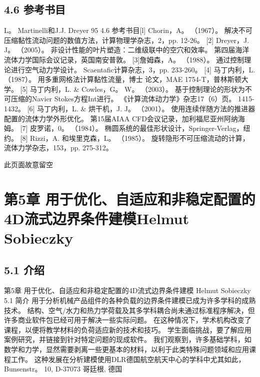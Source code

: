 \documentclass[UTF8,11pt,a4paper,openany,fontset=fandol]{ctexbook}
\begin{document}
\section{4.6 参考书目}
L。 Martinelli和J.J. Dreyer 95 4.6 参考书目[l] Chorin，A。 （1967）。 解决不可压缩黏性流动问题的数值方法，计算物理学杂志，2，pp. 12-26。 [2] Dreyer，J. J。 （2005）。 非设计性能的叶片塑造：二维级联中的空穴和效率。 第四届海洋流体力学国际会议记录，英国南安普敦。 [3]詹姆森，A。 （1988）。 通过控制理论进行空气动力学设计。 Scaentafic计算杂志，3，pp. 233-260。 [4] 马丁内利，L. （1987）。 用多重网格法计算黏性流量，博士 论文，MAE 1754-T，普林斯顿大学。 [5] 马丁内利，L. \& Cowles，G。 W。 （2003）。 基于控制理论的形状为不可压缩的Navier Stokes方程Int进行。 《计算流体动力学》杂志17（6）页。 1415-1432。 [6] 马丁内利，L. \& 烘干机，J. J。 （2001）。 使用连续伴随方法的推进器配置的流体力学外形优化。 第15届AIAA CFD会议记录，加利福尼亚州阿纳海姆。 [7] 皮罗诺，0。 （1984）。 椭圆系统的最佳形状设计，Springer-Verlag，纽约。 [8] Rizzi，A. 和埃里克森，L。 （1985）。 旋转隐形不可压缩流动的计算，流体力学杂志，153，pp. 275-312。

此页面故意留空

\clearpage
\chapter{第5章 用于优化、自适应和非稳定配置的4D流式边界条件建模Helmut Sobieczky}
\section{5.1 介绍}
第5章 用于优化、自适应和非稳定配置的4D流式边界条件建模 Helmut Sobieczky 5.1 简介 用于分析机械产品组件的各种负载的边界条件建模已成为许多学科的成熟技术。 结构、空气/水力和热力学荷载及其多学科耦合尚未通过标准程序解决，但许多商业软件包已经可用于解决一些实际问题。 在这种情况下，学术机构改变了课程，以便将教学材料的负荷适应新的技术和技巧。 学生面临挑战，要了解应用案例研究，并链接到针对特定问题的现成软件。 我们观察到，许多基础学科，如数学和力学，显然需要剥离一些更基本的材料，以利于此类特殊问题领域和应用课程工作。 这种发展在分析建模使用DLR德国航空航天中心的学科中尤其如此，Bunsenstr。 10, D-37073 哥廷根, 德国
\end{document}
